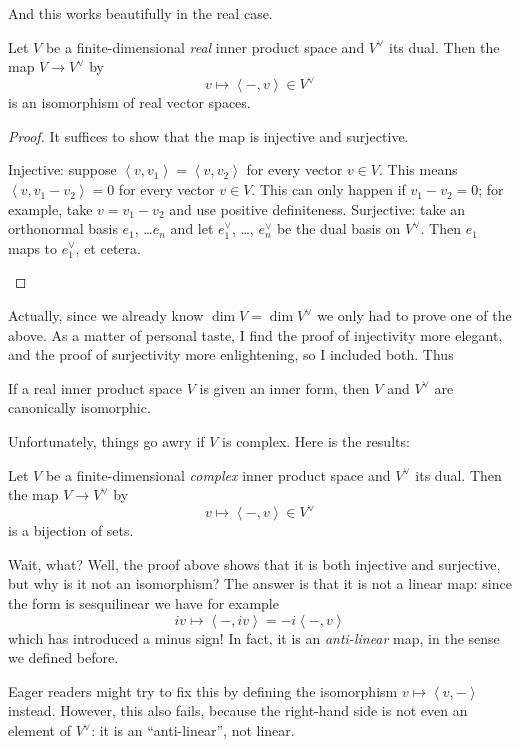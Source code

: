 And this works beautifully in the real case.
\begin{theorem}
	\label{thm:real_dual_isomorphic}
	Let $V$ be a finite-dimensional \emph{real}
	inner product space and $V^\vee$ its dual.
	Then the map $V \to V^\vee$ by
	\[ v \mapsto \left<  -, v \right> \in V^\vee \]
	is an isomorphism of real vector spaces.
\end{theorem}
\begin{proof}
	It suffices to show that the map is injective and surjective.
	\begin{itemize}
		\ii Injective: suppose $\left< v, v_1 \right> = \left< v, v_2 \right>$
		for every vector $v \in V$.
		This means $\left< v, v_1 - v_2 \right> = 0$ for every vector $v \in V$.
		This can only happen if $v_1 - v_2 = 0$; for example, take $v = v_1 - v_2$
		and use positive definiteness.
		\ii Surjective: take an orthonormal basis $e_1$, \dots $e_n$
		and let $e_1^\vee$, \dots, $e_n^\vee$ be the dual basis on $V^\vee$.
		Then $e_1$ maps to $e_1^\vee$, et cetera.
		\qedhere
	\end{itemize}
\end{proof}
Actually, since we already know $\dim V = \dim V^\vee$
we only had to prove one of the above.
As a matter of personal taste, I find the proof of injectivity more elegant,
and the proof of surjectivity more enlightening,
so I included both.
Thus
\begin{moral}
	If a real inner product space $V$ is given an inner form,
	then $V$ and $V^\vee$ are canonically isomorphic.
\end{moral}

Unfortunately, things go awry if $V$ is complex.
Here is the results:
\begin{theorem}
	Let $V$ be a finite-dimensional \emph{complex}
	inner product space and $V^\vee$ its dual.
	Then the map $V \to V^\vee$ by
	\[ v \mapsto \left<  -, v \right> \in V^\vee \]
	is a bijection of sets.
\end{theorem}
Wait, what? Well, the proof above shows that it is both injective
and surjective, but why is it not an isomorphism?
The answer is that it is not a linear map:
since the form is sesquilinear we have for example
\[ iv \mapsto \left< -, iv\right> = -i \left< -, v\right> \]
which has introduced a minus sign!
In fact, it is an \emph{anti-linear} map, in the sense we defined before.

Eager readers might try to fix this by defining
the isomorphism $v \mapsto \left< v, - \right>$ instead.
However, this also fails, because the right-hand side
is not even an element of $V^\vee$:
it is an ``anti-linear'', not linear.

